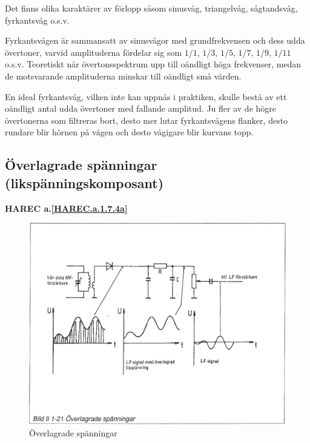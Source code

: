
Det finns olika karaktärer av förlopp såsom sinusvåg, triangelvåg, sågtandsvåg,
fyrkantsvåg o.s.v.

Fyrkantsvågen är sammansatt av sinusvågor med grundfrekvensen och dess udda
övertoner, varvid amplituderna fördelar sig som \(1/1\), \(1/3\), \(1/5\),
\(1/7\), \(1/9\), \(1/11\) o.s.v. Teoretiskt når övertonsspektrum upp till
oändligt höga frekvenser, medan de motsvarande amplituderna minskar till
oändligt små värden.

En ideal fyrkantsvåg, vilken inte kan uppnås i praktiken, skulle bestå av ett
oändligt antal udda övertoner med fallande amplitud. Ju fler av de högre
övertonerna som filtreras bort, desto mer lutar fyrkantsvågens flanker, desto
rundare blir hörnen på vågen och desto vågigare blir kurvans topp.

\subsection{Överlagrade spänningar
(likspänningskomposant)}
\textbf{HAREC a.\ref{HAREC.a.1.7.4a}\label{myHAREC.a.1.7.4a}}

\begin{figure}[h]
\includegraphics[width=\textwidth]{images/bild_2_1-21}
\caption{Överlagrade spänningar}
\label{fig:BildII1-21}
\end{figure}

